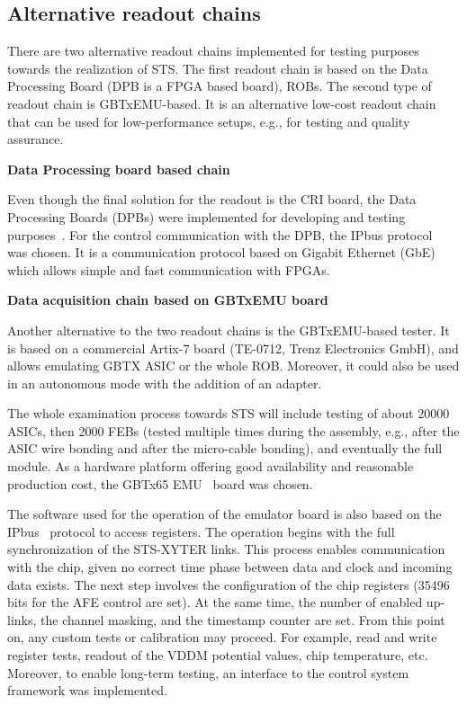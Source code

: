 \subsection{Alternative readout chains}
\label{tester}
There are two alternative readout chains implemented for testing purposes towards the realization of \gls{STS}. The first readout chain is based on the Data Processing Board (\gls{DPB} is a \gls{FPGA} based board), \glspl{ROB}. The second type of readout chain is GBTxEMU-based. It is an alternative low-cost readout chain that can be used for
low-performance setups, e.g., for testing and quality assurance. \bigbreak

\newpage
\textbf{Data Processing board based chain}\bigbreak


Even though the final solution for the readout is the \gls{CRI} board, the Data Processing Boards (\glspl{DPB}) were implemented for developing and testing purposes~\cite{Loizeau}. For the control communication with the \gls{DPB}, the IPbus protocol~\cite{ipbus} was chosen. It is a communication protocol based on Gigabit Ethernet (GbE) which allows simple and fast communication with \glspl{FPGA}.\bigbreak


\textbf{Data acquisition chain based on GBTxEMU board} \bigbreak


Another alternative to the two readout chains is the GBTxEMU-based tester. It is based on a commercial Artix-7 board (TE-0712, Trenz Electronics GmbH), and allows emulating GBTX ASIC or the whole \gls{ROB}. Moreover, it could also be used in an autonomous mode with the addition of an adapter.


The whole examination process towards \gls{STS} will include testing of about 20000 \glspl{ASIC}, then 2000 \glspl{FEB} (tested  multiple times during the assembly, e.g., after the \gls{ASIC} wire bonding and after the micro-cable bonding), and eventually the full module. As a hardware platform offering good availability and reasonable production cost, the GBTx65 EMU~\cite{zabolotny1} board was chosen.

The software used for the operation of the emulator board is also based on the IPbus~\cite{ipbus} protocol to access registers.
The operation begins with the full synchronization of the STS-XYTER links. This process enables communication with the chip, given no correct time phase between data and clock and incoming data exists. The next step involves the configuration of the chip registers (35496 bits for the AFE control are set). At the same time, the number of enabled up-links, the channel masking, and the timestamp counter are set.  From this point on, any custom tests or calibration may proceed. For example, read and write register tests, readout of the VDDM potential values, chip temperature, etc. Moreover, to enable long-term testing, an interface to the control system framework was implemented.

